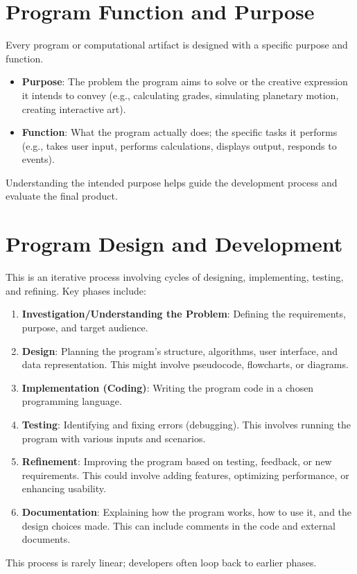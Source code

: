 \documentclass[11pt,oneside]{book}
\begin{document}
\section{Program Function and Purpose}
\label{sec:program_function_purpose}
Every program or computational artifact is designed with a specific purpose and function.
\begin{itemize}
    \item \textbf{Purpose}: The problem the program aims to solve or the creative expression it intends to convey (e.g., calculating grades, simulating planetary motion, creating interactive art).
    \item \textbf{Function}: What the program actually does; the specific tasks it performs (e.g., takes user input, performs calculations, displays output, responds to events).
\end{itemize}
Understanding the intended purpose helps guide the development process and evaluate the final product.

\section{Program Design and Development}
\label{sec:program_design_development}
This is an iterative process involving cycles of designing, implementing, testing, and refining. Key phases include:
\begin{enumerate}[label=\arabic*.]
    \item \textbf{Investigation/Understanding the Problem}: Defining the requirements, purpose, and target audience.
    \item \textbf{Design}: Planning the program's structure, algorithms, user interface, and data representation. This might involve pseudocode, flowcharts, or diagrams.
    \item \textbf{Implementation (Coding)}: Writing the program code in a chosen programming language.
    \item \textbf{Testing}: Identifying and fixing errors (debugging). This involves running the program with various inputs and scenarios.
    \item \textbf{Refinement}: Improving the program based on testing, feedback, or new requirements. This could involve adding features, optimizing performance, or enhancing usability.
    \item \textbf{Documentation}: Explaining how the program works, how to use it, and the design choices made. This can include comments in the code and external documents.
\end{enumerate}
This process is rarely linear; developers often loop back to earlier phases.
\end{document}
